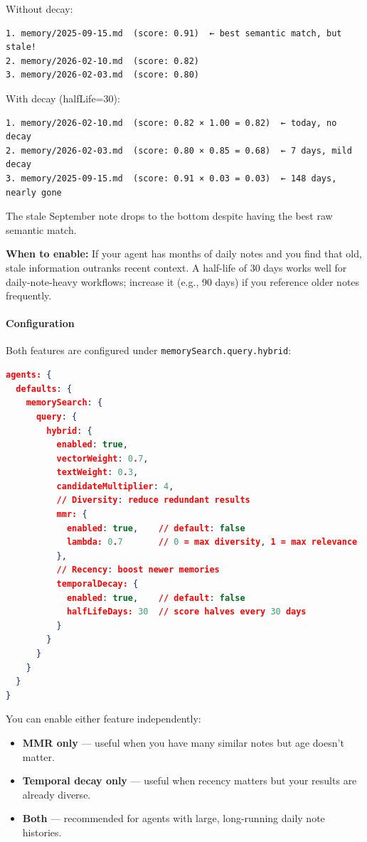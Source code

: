 Without decay:

\begin{lstlisting}
1. memory/2025-09-15.md  (score: 0.91)  ← best semantic match, but stale!
2. memory/2026-02-10.md  (score: 0.82)
3. memory/2026-02-03.md  (score: 0.80)
\end{lstlisting}


With decay (halfLife=30):

\begin{lstlisting}
1. memory/2026-02-10.md  (score: 0.82 × 1.00 = 0.82)  ← today, no decay
2. memory/2026-02-03.md  (score: 0.80 × 0.85 = 0.68)  ← 7 days, mild decay
3. memory/2025-09-15.md  (score: 0.91 × 0.03 = 0.03)  ← 148 days, nearly gone
\end{lstlisting}


The stale September note drops to the bottom despite having the best raw semantic match.

\textbf{When to enable:} If your agent has months of daily notes and you find that old,
stale information outranks recent context. A half-life of 30 days works well for
daily-note-heavy workflows; increase it (e.g., 90 days) if you reference older notes frequently.

\paragraph{Configuration}


Both features are configured under \texttt{memorySearch.query.hybrid}:

\begin{lstlisting}[language=json]
agents: {
  defaults: {
    memorySearch: {
      query: {
        hybrid: {
          enabled: true,
          vectorWeight: 0.7,
          textWeight: 0.3,
          candidateMultiplier: 4,
          // Diversity: reduce redundant results
          mmr: {
            enabled: true,    // default: false
            lambda: 0.7       // 0 = max diversity, 1 = max relevance
          },
          // Recency: boost newer memories
          temporalDecay: {
            enabled: true,    // default: false
            halfLifeDays: 30  // score halves every 30 days
          }
        }
      }
    }
  }
}
\end{lstlisting}


You can enable either feature independently:

\begin{itemize}
  \item \textbf{MMR only} — useful when you have many similar notes but age doesn't matter.
  \item \textbf{Temporal decay only} — useful when recency matters but your results are already diverse.
  \item \textbf{Both} — recommended for agents with large, long-running daily note histories.
\end{itemize}


